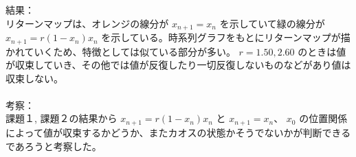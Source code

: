 結果：\\
リターンマップは、オレンジの線分が $x_{n+1} = x_n$ を示していて緑の線分が$x_{n+1} = r(1 −x_n)x_n$ を示している。時系列グラフをもとにリターンマップが描かれていくため、特徴としては似ている部分が多い。 $r = 1.50, 2.60$ のときは値が収束していき、その他では値が反復したり一切反復しないものなどがあり値は収束しない。\\\\

考察：\\
課題１, 課題２の結果から $x_{n+1} = r(1 −x_n)x_n$ と $x_{n+1} = x_n$、 $x_0$ の位置関係によって値が収束するかどうか、またカオスの状態かそうでないかが判断できるであろうと考察した。
